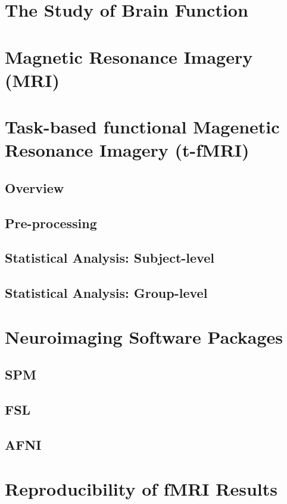 \section{The Study of Brain Function}

\section{Magnetic Resonance Imagery (MRI)}

\section{Task-based functional Magenetic Resonance Imagery (t-fMRI)}

\subsection{Overview}

\subsection{Pre-processing}

\subsection{Statistical Analysis: Subject-level}

\subsection{Statistical Analysis: Group-level}

\section{Neuroimaging Software Packages}

\subsection{SPM}

\subsection{FSL}

\subsection{AFNI}

\section{Reproducibility of fMRI Results}

